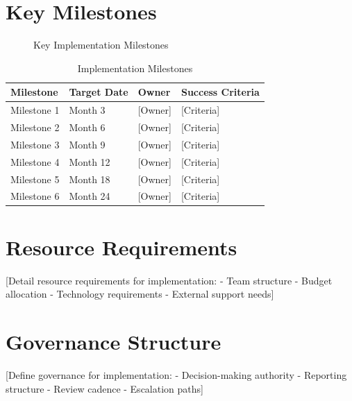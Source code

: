\documentclass[11pt,letterpaper]{report}
\begin{document}
\section{Key Milestones}


\begin{figure}[htbp]
\centering
\caption{Key Implementation Milestones}
\label{fig:milestones}
\end{figure}

\begin{table}[htbp]
\centering
\caption{Implementation Milestones}
\begin{tabular}{@{}llll@{}}
\toprule
\textbf{Milestone} & \textbf{Target Date} & \textbf{Owner} & \textbf{Success Criteria} \\
\midrule
Milestone 1 & Month 3 & [Owner] & [Criteria] \\
\rowcolor{tablealt} Milestone 2 & Month 6 & [Owner] & [Criteria] \\
Milestone 3 & Month 9 & [Owner] & [Criteria] \\
\rowcolor{tablealt} Milestone 4 & Month 12 & [Owner] & [Criteria] \\
Milestone 5 & Month 18 & [Owner] & [Criteria] \\
\rowcolor{tablealt} Milestone 6 & Month 24 & [Owner] & [Criteria] \\
\bottomrule
\end{tabular}
\label{tab:milestones}
\end{table}

\section{Resource Requirements}

[Detail resource requirements for implementation:
- Team structure
- Budget allocation
- Technology requirements
- External support needs]

\section{Governance Structure}

[Define governance for implementation:
- Decision-making authority
- Reporting structure
- Review cadence
- Escalation paths]

\end{document}
